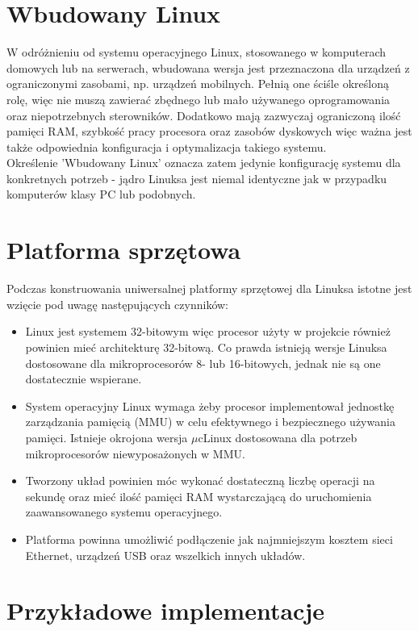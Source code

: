 \documentclass[a4paper,12pt]{book}
\begin{document}
		\section{Wbudowany Linux}
			W odróżnieniu od systemu operacyjnego Linux, stosowanego w komputerach domowych lub na serwerach, wbudowana wersja jest przeznaczona dla urządzeń z ograniczonymi zasobami, np. urządzeń mobilnych. Pełnią one ściśle określoną rolę, więc nie muszą zawierać zbędnego lub mało używanego oprogramowania oraz niepotrzebnych sterowników. Dodatkowo mają zazwyczaj ograniczoną ilość pamięci RAM, szybkość pracy procesora oraz zasobów dyskowych więc ważna jest także odpowiednia konfiguracja i optymalizacja takiego systemu.\\
			Określenie 'Wbudowany Linux' oznacza zatem jedynie konfigurację systemu dla konkretnych potrzeb - jądro Linuksa jest niemal identyczne jak w przypadku komputerów klasy PC lub podobnych.
		\section{Platforma sprzętowa}
			Podczas konstruowania uniwersalnej platformy sprzętowej dla Linuksa istotne jest wzięcie pod uwagę następujących czynników:
			\begin{itemize}
				\item Linux jest systemem 32-bitowym więc procesor użyty w projekcie również powinien mieć architekturę 32-bitową. Co prawda istnieją wersje Linuksa dostosowane dla mikroprocesorów 8- lub 16-bitowych, jednak nie są one dostatecznie wspierane.
				\item System operacyjny Linux wymaga żeby procesor implementował jednostkę zarządzania pamięcią (MMU) w celu efektywnego i bezpiecznego używania pamięci. Istnieje okrojona wersja $\mu$cLinux\cite{uclinux} dostosowana dla potrzeb mikroprocesorów niewyposażonych w MMU.
				\item Tworzony układ powinien móc wykonać dostateczną liczbę operacji na sekundę oraz mieć ilość pamięci RAM wystarczającą do uruchomienia zaawansowanego systemu operacyjnego.
				\item Platforma powinna umożliwić podłączenie jak najmniejszym kosztem sieci Ethernet, urządzeń USB oraz wszelkich innych układów.
			\end{itemize}
		\section{Przykładowe implementacje}
\end{document}
